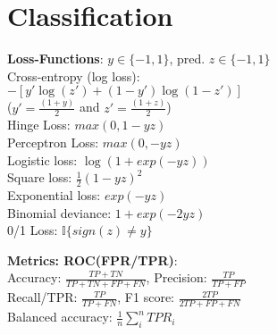 \section{Classification}
\textbf{Loss-Functions}:
$y \in \{-1,1\}$, pred. $z \in \{-1,1\}$\\
Cross-entropy (log loss):\\
$-[y'\log(z') {+} (1-y')\log(1-z')]$\\ 
($y'=\tfrac{(1+y)}{2}$ and $z'=\tfrac{(1+z)}{2}$) \\
Hinge Loss: $max(0, 1-yz)$ \\
Perceptron Loss: $ max(0, -yz)$ \\
Logistic loss: $\log(1 + exp(-yz))$ \\
Square loss: $\tfrac{1}{2}(1-yz)^2$ \\
Exponential loss: $exp(-yz)$ \\
Binomial deviance: $1 + exp(-2yz)$ \\
0/1 Loss: $\mathbb{I}\{sign(z)\neq y\}$

\textbf{Metrics: ROC(FPR/TPR)}:\\
Accuracy: $\frac{TP+TN}{TP+TN+FP+FN}$, Precision: $\frac{TP}{TP+FP}$\\ Recall/TPR: $\frac{TP}{TP+FN}$, F1 score: $\frac{2TP}{2TP+FP+FN}$\\
Balanced accuracy: $\frac{1}{n}\sum_i^n TPR_i$
